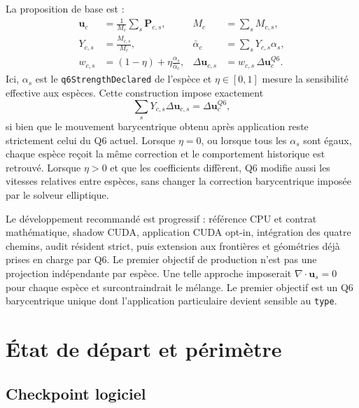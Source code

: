 \documentclass[11pt,a4paper]{article}
\newcommand{\code}[1]{\texttt{#1}}
\newcommand{\vect}[1]{\bm{#1}}
\begin{document}
La proposition de base est :
\begin{align}
  \vect{u}_c &= \frac{1}{M_c}\sum_s \vect{P}_{c,s},
  & M_c &= \sum_s M_{c,s}, \\
  Y_{c,s} &= \frac{M_{c,s}}{M_c},
  & \bar\alpha_c &= \sum_s Y_{c,s}\alpha_s, \\
  w_{c,s} &= (1-\eta) + \eta\frac{\alpha_s}{\bar\alpha_c},
  & \Delta\vect{u}_{c,s} &= w_{c,s}\,\Delta\vect{u}^{Q6}_c.
\end{align}
Ici, \(\alpha_s\) est le \code{q6StrengthDeclared} de l'espèce et \(\eta\in[0,1]\) mesure la sensibilité effective aux espèces. Cette construction impose exactement
\begin{equation}
  \sum_s Y_{c,s}\Delta\vect{u}_{c,s}=\Delta\vect{u}^{Q6}_c,
\end{equation}
si bien que le mouvement barycentrique obtenu après application reste strictement celui du Q6 actuel. Lorsque \(\eta=0\), ou lorsque tous les \(\alpha_s\) sont égaux, chaque espèce reçoit la même correction et le comportement historique est retrouvé. Lorsque \(\eta>0\) et que les coefficients diffèrent, Q6 modifie aussi les vitesses relatives entre espèces, sans changer la correction barycentrique imposée par le solveur elliptique.

Le développement recommandé est progressif : référence CPU et contrat mathématique, shadow CUDA, application CUDA opt-in, intégration des quatre chemins, audit résident strict, puis extension aux frontières et géométries déjà prises en charge par Q6. Le premier objectif de production n'est pas une projection indépendante par espèce. Une telle approche imposerait \(\nabla\cdot\vect{u}_s=0\) pour chaque espèce et surcontraindrait le mélange. Le premier objectif est un Q6 barycentrique unique dont l'application particulaire devient sensible au \code{type}.

\section{État de départ et périmètre}

\subsection{Checkpoint logiciel}
\end{document}
